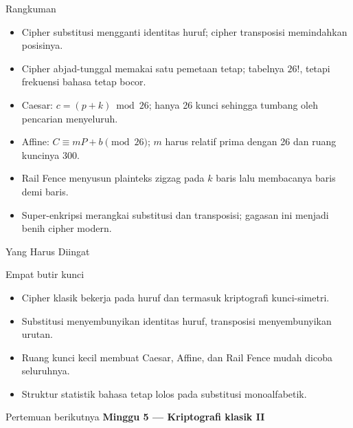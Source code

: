 \documentclass[aspectratio=169,11pt]{beamer}
\begin{document}
\begin{frame}{Rangkuman}
    \footnotesize
    \begin{itemize}
        \item Cipher substitusi mengganti identitas huruf; cipher transposisi
              memindahkan posisinya.
        \item Cipher abjad-tunggal memakai satu pemetaan tetap; tabelnya
              $26!$, tetapi frekuensi bahasa tetap bocor.
        \item Caesar: $c=(p+k)\bmod 26$; hanya 26 kunci sehingga tumbang oleh
              pencarian menyeluruh.
        \item Affine: $C\equiv mP+b\pmod{26}$; $m$ harus relatif prima dengan
              26 dan ruang kuncinya 300.
        \item Rail Fence menyusun plainteks zigzag pada $k$ baris lalu
              membacanya baris demi baris.
        \item Super-enkripsi merangkai substitusi dan transposisi; gagasan ini
              menjadi benih cipher modern.
    \end{itemize}
\end{frame}

\begin{frame}{Yang Harus Diingat}
    \begin{block}{Empat butir kunci}
        \begin{itemize}
            \item Cipher klasik bekerja pada huruf dan termasuk kriptografi
                  kunci-simetri.
            \item Substitusi menyembunyikan identitas huruf, transposisi
                  menyembunyikan urutan.
            \item Ruang kunci kecil membuat Caesar, Affine, dan Rail Fence
                  mudah dicoba seluruhnya.
            \item Struktur statistik bahasa tetap lolos pada substitusi
                  monoalfabetik.
        \end{itemize}
    \end{block}
    \vspace{0.25cm}
    \begin{exampleblock}{Pertemuan berikutnya}
        \textbf{Minggu 5 --- Kriptografi klasik II}
    \end{exampleblock}
\end{frame}
\end{document}
